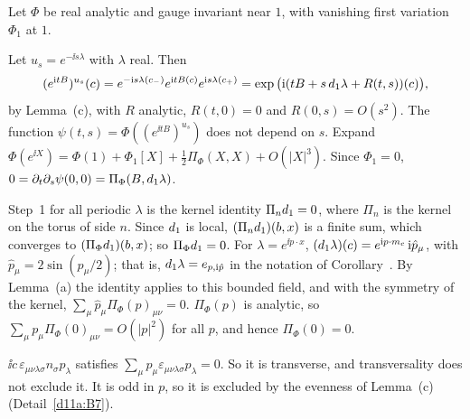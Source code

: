 \begin{detail}\label{d11a:B2}
Let $\Phi$ be real analytic and gauge invariant near $1$, with vanishing first variation $\Phi_1$ at $1$.
\begin{step}[$\Pi_\Phi(B,\dl\lambda)=0$ on the torus]
Let $u_s=e^{-\ii s\lambda}$ with $\lambda$ real. Then
\[
(e^{\mathrm i tB})^{u_s}(c)=e^{-\mathrm i s\lambda(c_-)}e^{\mathrm i tB(c)}e^{\mathrm i s\lambda(c_+)}=\exp\big(\mathrm i(tB+s\,d_1\lambda+R(t,s))(c)\big),
\]
by Lemma~(c), with $R$ analytic, $R(t,0)=0$ and $R(0,s)=O(s^2)$. The function $\psi(t,s)=\Phi((e^{\ii tB})^{u_s})$ does not depend on $s$. Expand $\Phi(e^{\ii X})=\Phi(1)+\Phi_1[X]+\frac12\Pi_\Phi(X,X)+O(|X|^3)$. Since $\Phi_1=0$, $0=\partial_t\partial_s\psi(0,0)=\Pi_\Phi(B,d_1\lambda)$.
\end{step}
\begin{step}[Transversality and $\Pi_\Phi(0)=0$ in infinite volume]
Step~1 for all periodic $\lambda$ is the kernel identity $\Pi_nd_1=0$, where $\Pi_n$ is the kernel on the torus of side $n$. Since $d_1$ is local, $(\Pi_nd_1)(b,x)$ is a finite sum, which converges to $(\Pi_\Phi d_1)(b,x)$; so $\Pi_\Phi d_1=0$. For $\lambda=e^{\ii p\cdot x}$, $(d_1\lambda)(c)=e^{\mathrm i p\cdot m_c}\,\mathrm i\hat p_\mu$, with $\hat p_\mu=2\sin(p_\mu/2)$; that is, $d_1\lambda=e_{p,\mathrm i\hat p}$ in the notation of Corollary~. By Lemma~(a) the identity applies to this bounded field, and with the symmetry of the kernel, $\sum_\mu\hat p_\mu\Pi_\Phi(p)_{\mu\nu}=0$. $\Pi_\Phi(p)$ is analytic, so $\sum_\mu p_\mu\Pi_\Phi(0)_{\mu\nu}=O(|p|^2)$ for all $p$, and hence $\Pi_\Phi(0)=0$.
\end{step}
\begin{step}
$\ii c\,\varepsilon_{\mu\nu\lambda\sigma}n_\sigma p_\lambda$ satisfies $\sum_\mu p_\mu\varepsilon_{\mu\nu\lambda\sigma}p_\lambda=0$. So it is transverse, and transversality does not exclude it. It is odd in $p$, so it is excluded by the evenness of Lemma~(c) (Detail~\ref{d11a:B7}).
\end{step}
\end{detail}

